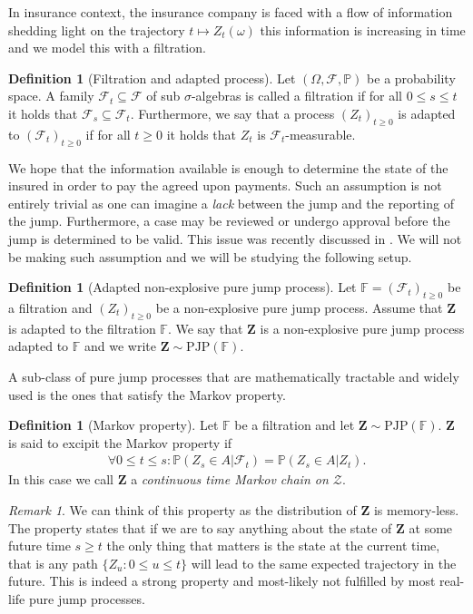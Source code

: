\documentclass[12pt,letter,twoside]{article}
\theoremstyle{plain}
\theoremstyle{definition}
\newtheorem{definition}[theorem]{Definition}
\theoremstyle{remark}
\newtheorem*{remark}{Remark}
\begin{document}
In insurance context, the insurance company is faced with a flow of information shedding light on the trajectory $t\mapsto Z_t(\omega)$ this information is increasing in time and we model this with a filtration.
\begin{definition}[Filtration and adapted process]
Let $(\Omega, \mathcal F , \mathbb P)$ be a probability space. A family $\mathcal F_t\subseteq \mathcal F$ of sub $\sigma$-algebras is called a filtration if for all $0\le s\le t$ it holds that $\mathcal F_s\subseteq \mathcal F_t$. Furthermore, we say that a process $(Z_t)_{t\ge 0}$ is adapted to $(\mathcal F_t)_{t\ge 0}$ if for all $t\ge 0$ it holds that $Z_t$ is $\mathcal F_t$-measurable.
\end{definition}
We hope that the information available is enough to determine the state of the insured in order to pay the agreed upon payments. Such an assumption is not entirely trivial as one can imagine a \textit{lack} between the jump and the reporting of the jump. Furthermore, a case may be reviewed or undergo approval before the jump is determined to be valid. This issue was recently discussed in \cite{Buchardt2023}. We will not be making such assumption and we will be studying the following setup.
\begin{definition}[Adapted non-explosive pure jump process]
Let $\mathbb F = (\mathcal F_t)_{t\ge 0}$ be a filtration and $(Z_t)_{t\ge 0}$ be a non-explosive pure jump process. Assume that $\mathbf Z$ is adapted to the filtration $\mathbb F$. We say that $\mathbf Z$ is a non-explosive pure jump process adapted to $\mathbb F$ and we write $\mathbf Z\sim \text{PJP}(\mathbb F)$.
\end{definition}
A sub-class of pure jump processes that are mathematically tractable and widely used is the ones that satisfy the Markov property.
\begin{definition}[Markov property]
Let $\mathbb F$ be a filtration and let $\mathbf Z\sim \text{PJP}(\mathbb F)$. $\mathbf Z$ is said to excipit the Markov property if
\begin{align}
\forall 0\le t\le s: \mathbb P(Z_s\in A\vert \mathcal F_t)=\mathbb P(Z_s\in A\vert Z_t).
\end{align}
In this case we call $\mathbf Z$ a \textit{continuous time Markov chain on $\mathcal Z$}.
\end{definition}
\begin{remark}
We can think of this property as the distribution of $\mathbf Z$ is memory-less. The property states that if we are to say anything about the state of $\mathbf Z$ at some future time $s\ge t$ the only thing that matters is the state at the current time, that is any path $\{ Z_u : 0\le u\le t\}$ will lead to the same expected trajectory in the future. This is indeed a strong property and most-likely not fulfilled by most real-life pure jump processes.
\end{remark}
\end{document}
